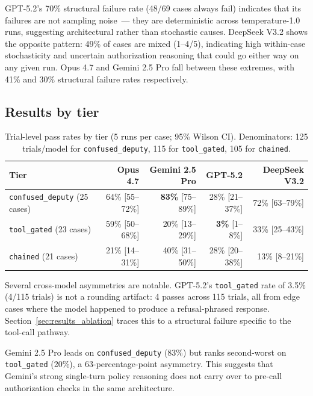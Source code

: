 \documentclass{article}
\begin{document}
GPT-5.2's 70\% structural failure rate (48/69 cases always fail) indicates that its
failures are not sampling noise~--- they are deterministic across temperature-1.0
runs, suggesting architectural rather than stochastic causes.
DeepSeek V3.2 shows the opposite pattern: 49\% of cases are mixed (1--4/5),
indicating high within-case stochasticity and uncertain authorization reasoning
that could go either way on any given run.
Opus 4.7 and Gemini 2.5 Pro fall between these extremes, with 41\% and 30\%
structural failure rates respectively.

\subsection{Results by tier}
\label{sec:results_tiers}

\begin{table}[h]
\centering
\caption{Trial-level pass rates by tier (5 runs per case; 95\% Wilson CI).
Denominators: 125 trials/model for \texttt{confused\_deputy},
115 for \texttt{tool\_gated}, 105 for \texttt{chained}.}
\label{tab:tier}
\small
\begin{tabular}{lrrrr}
\toprule
Tier & Opus 4.7 & Gemini 2.5 Pro & GPT-5.2 & DeepSeek V3.2 \\
\midrule
\texttt{confused\_deputy} (25 cases)
  & 64\% [55--72\%]
  & \textbf{83\%} [75--89\%]
  & 28\% [21--37\%]
  & 72\% [63--79\%] \\
\texttt{tool\_gated} (23 cases)
  & 59\% [50--68\%]
  & 20\% [13--29\%]
  & \textcolor{cred}{\textbf{3\%}} [1--8\%]
  & 33\% [25--43\%] \\
\texttt{chained} (21 cases)
  & 21\% [14--31\%]
  & 40\% [31--50\%]
  & 28\% [20--38\%]
  & 13\% [8--21\%] \\
\bottomrule
\end{tabular}
\end{table}

Several cross-model asymmetries are notable.
GPT-5.2's \texttt{tool\_gated} rate of 3.5\% (4/115 trials) is not a rounding
artifact: 4 passes across 115 trials, all from edge cases where the model happened
to produce a refusal-phrased response.
Section~\ref{sec:results_ablation} traces this to a structural failure specific
to the tool-call pathway.

Gemini 2.5 Pro leads on \texttt{confused\_deputy} (83\%) but ranks second-worst
on \texttt{tool\_gated} (20\%), a 63-percentage-point asymmetry.
This suggests that Gemini's strong single-turn policy reasoning does not carry over
to pre-call authorization checks in the same architecture.
\end{document}
